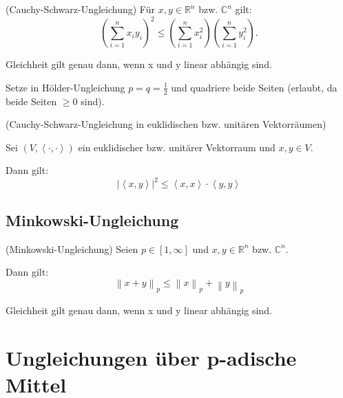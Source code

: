 \documentclass[10pt]{scrbook}
\begin{document}
\begin{Kor} (Cauchy-Schwarz-Ungleichung)
Für $x, y\in \mathbb{R}^n$  bzw. $\mathbb{C}^n$ gilt:
\begin{equation}
\left(\sum_{i=1}^n x_i y_i\right)^2 \leq \left(\sum_{i=1}^n x_i^2\right) \left(\sum_{i=1}^n y_i^2\right).
\end{equation}

Gleichheit gilt genau dann, wenn x und y linear abhängig sind.
\end{Kor}
\begin{bew}
Setze in Hölder-Ungleichung $p=q=\frac{1}{2}$ und quadriere beide Seiten (erlaubt, da beide Seiten $\geq 0$ sind).
\end{bew}

\begin{Le} (Cauchy-Schwarz-Ungleichung in euklidischen bzw. unitären Vektorräumen)

Sei $(V, \left\langle\cdot, \cdot\right\rangle)$ ein euklidischer bzw. unitärer Vektorraum und $x, y\in V$.

Dann gilt:
\begin{equation}
\left|\left\langle x, y\right\rangle\right|^2 \leq \left\langle x, x\right\rangle \cdot \left\langle y, y\right\rangle
\end{equation}
\end{Le}

\subsection{Minkowski-Ungleichung}

\begin{Sa} (Minkowski-Ungleichung)
Seien $p\in\left[1, \infty\right]$ und $x, y \in \mathbb{R}^n$ bzw. $\mathbb{C}^n$.

Dann gilt:
\begin{equation}
\left\|x+y\right\|_p \leq \left\|x\right\|_p + \left\|y\right\|_p 
\end{equation}

Gleichheit gilt genau dann, wenn x und y linear abhängig sind.
\end{Sa}

\section{Ungleichungen über p-adische Mittel}
\end{document}
